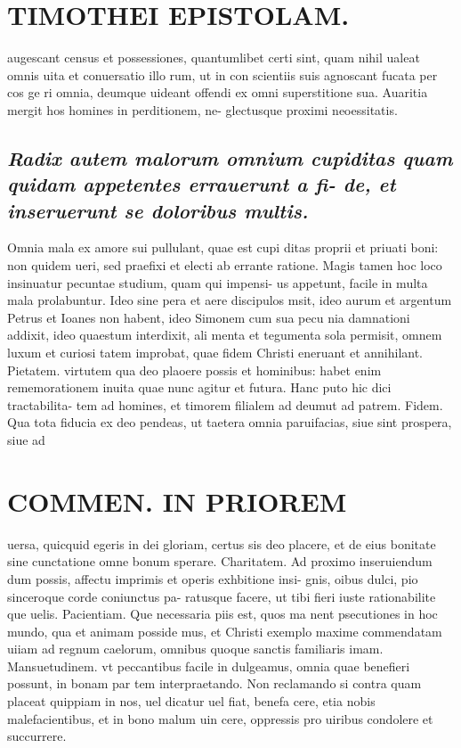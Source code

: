 \documentclass{article}
\begin{document}
\begin{pages}
\section*{TIMOTHEI EPISTOLAM. }
\marginpar{[ p.169 ]}\pstart augescant census et possessiones, quantumlibet certi sint, quam nihil ualeat omnis uita et conuersatio illo rum, ut in con scientiis suis agnoscant fucata per cos ge ri omnia, deumque uideant offendi ex omni superstitione sua. Auaritia mergit hos homines in perditionem, ne- glectusque proximi neoessitatis.  \pend
{}
{}
\subsection*{\textit{Radix autem malorum omnium cupiditas quam quidam appetentes errauerunt a fi- de, et inseruerunt se doloribus multis. }}\pstart Omnia mala ex amore sui pullulant, quae est cupi ditas proprii et priuati boni: non quidem ueri, sed praefixi et electi ab errante ratione. Magis tamen hoc loco insinuatur pecuntae studium, quam qui impensi- us appetunt, facile in multa mala prolabuntur. Ideo sine pera et aere discipulos msit, ideo aurum et argentum Petrus et Ioanes non habent, ideo Simonem cum sua pecu nia damnationi addixit, ideo quaestum interdixit, ali menta et tegumenta sola permisit, omnem luxum et curiosi tatem improbat, quae fidem Christi eneruant et annihilant.  \pend\pstart Pietatem. virtutem qua deo plaoere possis et hominibus: habet enim rememorationem inuita quae nunc agitur et futura. Hanc puto hic dici tractabilita- tem ad homines, et timorem filialem ad deumut ad patrem.  \pend\pstart Fidem. Qua tota fiducia ex deo pendeas, ut taetera omnia paruifacias, siue sint prospera, siue ad  \pend
\section*{COMMEN. IN PRIOREM }
\marginpar{[ p.170 ]}\pstart uersa, quicquid egeris in dei gloriam, certus sis deo placere, et de eius bonitate sine cunctatione omne bonum sperare.  \pend\pstart Charitatem. Ad proximo inseruiendum dum possis, affectu imprimis et operis exhbitione insi- gnis, oibus dulci, pio sinceroque corde coniunctus pa- ratusque facere, ut tibi fieri iuste rationabilite que uelis.  \pend\pstart Pacientiam. Que necessaria piis est, quos ma nent psecutiones in hoc mundo, qua et animam posside mus, et Christi exemplo maxime commendatam uiiam ad regnum caelorum, omnibus quoque sanctis familiaris imam.  \pend\pstart Mansuetudinem. vt peccantibus facile in dulgeamus, omnia quae benefieri possunt, in bonam par tem interpraetando. Non reclamando si contra quam placeat quippiam in nos, uel dicatur uel fiat, benefa cere, etia nobis malefacientibus, et in bono malum uin cere, oppressis pro uiribus condolere et succurrere.  \pend
{}
{}

\end{pages}
\end{document}
